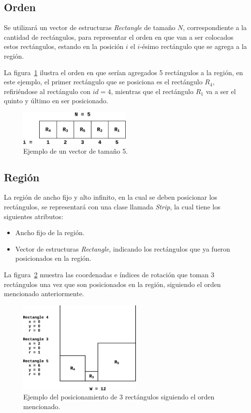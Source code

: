 \documentclass[letter, 10pt]{article}
\begin{document}
\subsection{Orden}

Se utilizar\'a un vector de estructuras \emph{Rectangle} de tama\~no $N$, correspondiente a la cantidad de rect\'angulos, para representar el orden en que van a ser colocados estos rect\'angulos, estando en la posici\'on $i$ el $i$-\'esimo rect\'angulo que se agrega a la regi\'on.

La figura~\ref{fig:orden} ilustra el orden en que ser\'ian agregados 5 rect\'angulos a la regi\'on, en este ejemplo, el primer rect\'angulo que se posiciona es el rect\'angulo $R_4$, refiri\'endose al rect\'angulo con $id = 4$, mientras que el rect\'angulo $R_1$ va a ser el quinto y \'ultimo en ser posicionado.

\begin{figure}[H]
    \centering
    \includegraphics[width=0.5\textwidth]{images/orden.eps}
    \caption{Ejemplo de un vector de tama\~no 5.}
    \label{fig:orden}
\end{figure}

\subsection{Regi\'on}

La regi\'on de ancho fijo y alto infinito, en la cual se deben posicionar los rect\'angulos, se representar\'a con una clase llamada \emph{Strip}, la cual tiene los siguientes atributos:
\begin{itemize}
    \item Ancho fijo de la regi\'on.
    \item Vector de estructuras \emph{Rectangle}, indicando los rect\'angulos que ya fueron posicionados en la regi\'on.
\end{itemize}

La figura~\ref{fig:region} muestra las coordenadas e \'indices de rotaci\'on que toman 3 rect\'angulos una vez que son posicionados en la regi\'on, siguiendo el orden mencionado anteriormente.

\begin{figure}[H]
    \centering
    \includegraphics[width = 0.55\textwidth]{images/region.eps}
    \caption{Ejemplo del posicionamiento de 3 rect\'angulos siguiendo el orden mencionado.}
    \label{fig:region}
\end{figure}
\end{document}
